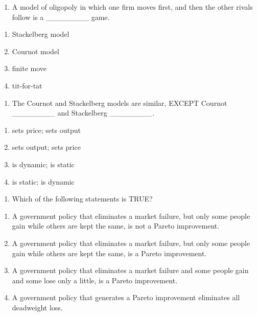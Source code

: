 \documentclass[11pt,]{article}
\providecommand{\tightlist}{%
  \setlength{\itemsep}{0pt}\setlength{\parskip}{0pt}}
\begin{document}
\newpage

\begin{enumerate}
\def\labelenumi{\arabic{enumi})}
\setcounter{enumi}{5}
\tightlist
\item
  A model of oligopoly in which one firm moves first, and then the other
  rivals follow is a \_\_\_\_\_\_\_\_ game.
\end{enumerate}

\begin{enumerate}
\def\labelenumi{\Alph{enumi})}
\tightlist
\item
  Stackelberg model
\item
  Cournot model
\item
  finite move
\item
  tit-for-tat
\end{enumerate}

\begin{enumerate}
\def\labelenumi{\arabic{enumi})}
\setcounter{enumi}{6}
\tightlist
\item
  The Cournot and Stackelberg models are similar, EXCEPT Cournot
  \_\_\_\_\_\_\_\_ and Stackelberg \_\_\_\_\_\_\_\_.
\end{enumerate}

\begin{enumerate}
\def\labelenumi{\Alph{enumi})}
\tightlist
\item
  sets price; sets output
\item
  sets output; sets price
\item
  is dynamic; is static
\item
  is static; is dynamic
\end{enumerate}

\begin{enumerate}
\def\labelenumi{\arabic{enumi})}
\setcounter{enumi}{7}
\tightlist
\item
  Which of the following statements is TRUE?
\end{enumerate}

\begin{enumerate}
\def\labelenumi{\Alph{enumi})}
\tightlist
\item
  A government policy that eliminates a market failure, but only some
  people gain while others are kept the same, is not a Pareto
  improvement.
\item
  A government policy that eliminates a market failure, but only some
  people gain while others are kept the same, is a Pareto improvement.
\item
  A government policy that eliminates a market failure and some people
  gain and some lose only a little, is a Pareto improvement.
\item
  A government policy that generates a Pareto improvement eliminates all
  deadweight loss.
\end{enumerate}
\end{document}
